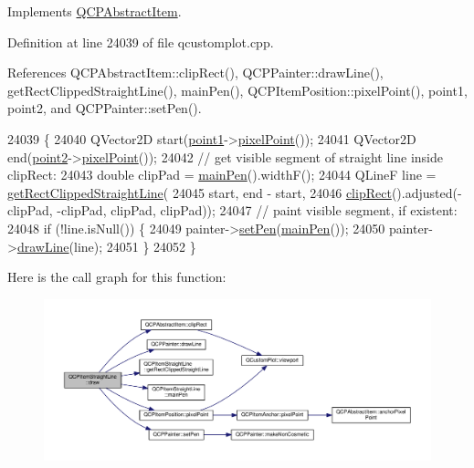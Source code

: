 Implements \hyperlink{class_q_c_p_abstract_item_ad0dc056f650c3ca73414e6b4f01674ef}{Q\+C\+P\+Abstract\+Item}.



Definition at line 24039 of file qcustomplot.\+cpp.



References Q\+C\+P\+Abstract\+Item\+::clip\+Rect(), Q\+C\+P\+Painter\+::draw\+Line(), get\+Rect\+Clipped\+Straight\+Line(), main\+Pen(), Q\+C\+P\+Item\+Position\+::pixel\+Point(), point1, point2, and Q\+C\+P\+Painter\+::set\+Pen().


\begin{DoxyCode}
24039                                                   \{
24040   QVector2D start(\hyperlink{class_q_c_p_item_straight_line_ac131a6ffe456f2cc7364dce541fe0120}{point1}->\hyperlink{class_q_c_p_item_position_ae490f9c76ee2ba33752c495d3b6e8fb5}{pixelPoint}());
24041   QVector2D end(\hyperlink{class_q_c_p_item_straight_line_ad26c0a732e471f63f75d481dcd48cfc9}{point2}->\hyperlink{class_q_c_p_item_position_ae490f9c76ee2ba33752c495d3b6e8fb5}{pixelPoint}());
24042   \textcolor{comment}{// get visible segment of straight line inside clipRect:}
24043   \textcolor{keywordtype}{double} clipPad = \hyperlink{class_q_c_p_item_straight_line_a63ef39814c5b560dbb7b13e3fec1d940}{mainPen}().widthF();
24044   QLineF line = \hyperlink{class_q_c_p_item_straight_line_af18ac29577b5b96fece15b0ffea70177}{getRectClippedStraightLine}(
24045       start, end - start,
24046       \hyperlink{class_q_c_p_abstract_item_a538e25ff8856534582f5b2b400a46405}{clipRect}().adjusted(-clipPad, -clipPad, clipPad, clipPad));
24047   \textcolor{comment}{// paint visible segment, if existent:}
24048   \textcolor{keywordflow}{if} (!line.isNull()) \{
24049     painter->\hyperlink{class_q_c_p_painter_af9c7a4cd1791403901f8c5b82a150195}{setPen}(\hyperlink{class_q_c_p_item_straight_line_a63ef39814c5b560dbb7b13e3fec1d940}{mainPen}());
24050     painter->\hyperlink{class_q_c_p_painter_a0b4b1b9bd495e182c731774dc800e6e0}{drawLine}(line);
24051   \}
24052 \}
\end{DoxyCode}


Here is the call graph for this function\+:\nopagebreak
\begin{figure}[H]
\begin{center}
\leavevmode
\includegraphics[width=350pt]{class_q_c_p_item_straight_line_a2daa1e1253216c26565d56a2d5530170_cgraph}
\end{center}
\end{figure}


